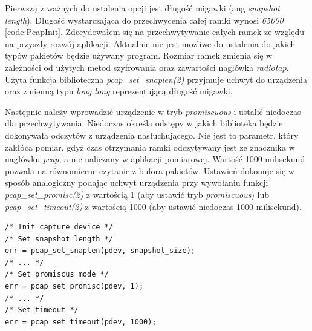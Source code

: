 Pierwszą z ważnych do ustalenia opcji jest długość migawki (ang \emph{snapshot length}). Długość wystarczająca do przechwycenia całej ramki wynosi \emph{65000} \ref{code:PcapInit}. Zdecydowałem się na przechwytywanie całych ramek ze względu na przyszły rozwój aplikacji. Aktualnie nie jest możliwe do ustalenia do jakich typów pakietów będzie używany program. Rozmiar ramek zmienia się w zależności od użytych metod szyfrowania oraz zawartości nagłówka \emph{radiotap}. Użyta funkcja biblioteczna \emph{pcap\_set\_snaplen(2)} przyjmuje uchwyt do urządzenia oraz zmienną typu \emph{long long} reprezentującą długość migawki. 


Następnie należy wprowadzić urządzenie w tryb \emph{promiscuous} i ustalić niedoczas dla przechwytywania. Niedoczas określa odstępy w jakich biblioteka będzie dokonywała odczytów z urządzenia nasłuchującego. Nie jest to parametr, który zakłóca pomiar, gdyż czas otrzymania ramki odczytywany jest ze znacznika w nagłówku \emph{pcap}, a nie naliczany w aplikacji pomiarowej. Wartość 1000 milisekund pozwala na równomierne czytanie z bufora pakietów. Ustawień dokonuje się w sposób analogiczny podając uchwyt urządzenia przy wywołaniu funkcji \emph{pcap\_set\_promisc(2)} z wartością 1 (aby ustawić tryb \emph{promiscuous}) lub \emph{pcap\_set\_timeout(2)} z wartością 1000 (aby ustawić niedoczas 1000 milisekund).

\begin{lstlisting}[frame=tb]
/* Init capture device */
/* Set snapshot length */
err = pcap_set_snaplen(pdev, snapshot_size);
/* ... */
/* Set promiscus mode */
err = pcap_set_promisc(pdev, 1);
/* ... */
/* Set timeout */
err = pcap_set_timeout(pdev, 1000);
\end{lstlisting}

